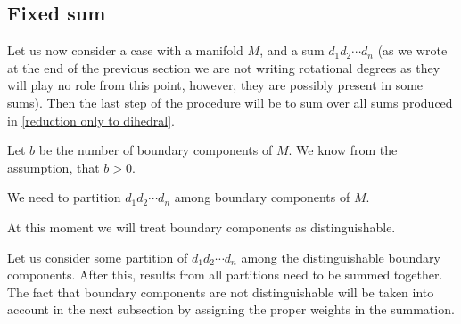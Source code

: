 \subsection{Fixed sum}

Let us now consider a case with a manifold $M$, and a sum $d_1d_2\cdots d_n$ (as we wrote 
at the end of the previous section we are not writing rotational degrees as 
they will play no role from this point, however, they are possibly present in some sums). 
Then the last step of the procedure will be to sum over all sums produced in 
\ref{reduction only to dihedral}. 



Let $b$ be the number of boundary components of $M$. We know from the assumption, that $b > 0$. 



We need to partition $d_1d_2\cdots d_n$ among boundary 
components of $M$. 


At this moment we will treat boundary components as distinguishable. 

Let us consider some partition of $d_1d_2\cdots d_n$ among the 
distinguishable  boundary 
components. After this, results from all partitions need to be summed together. 
The fact that boundary components are not distinguishable 
will be taken into account in the next subsection by assigning the proper weights in the summation.




